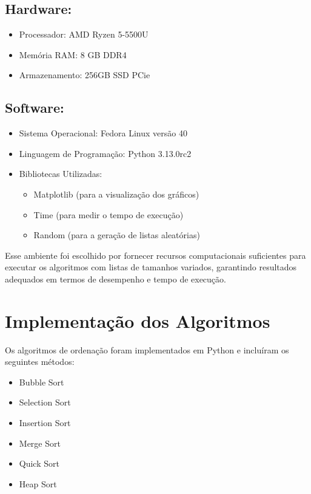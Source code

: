 \documentclass[tcc1,project]{uftex}
\begin{document}
\subsection{Hardware:}
\begin{itemize}
    \item Processador: AMD Ryzen 5-5500U
    \item Memória RAM: 8 GB DDR4
    \item Armazenamento: 256GB SSD PCie
\end{itemize}

\subsection{Software:}
\begin{itemize}
    \item Sistema Operacional: Fedora Linux versão 40
    \item Linguagem de Programação: Python 3.13.0rc2
    \item Bibliotecas Utilizadas:
        \begin{itemize}
            \item Matplotlib (para a visualização dos gráficos)
            \item Time (para medir o tempo de execução)
            \item Random (para a geração de listas aleatórias)
        \end{itemize}
\end{itemize}

Esse ambiente foi escolhido por fornecer recursos computacionais suficientes para executar os algoritmos com listas de tamanhos variados, garantindo resultados adequados em termos de desempenho e tempo de execução.

\section{Implementação dos Algoritmos}
Os algoritmos de ordenação foram implementados em Python e incluíram os seguintes métodos:
\begin{itemize}
    \item Bubble Sort
    \item Selection Sort
    \item Insertion Sort
    \item Merge Sort
    \item Quick Sort
    \item Heap Sort
\end{itemize}
\end{document}
